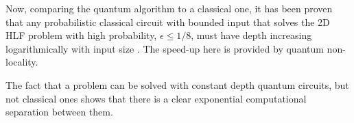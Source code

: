 Now, comparing the quantum algorithm to a classical one, it has been proven that any probabilistic classical circuit with bounded input that solves the 2D HLF problem with high probability, $\epsilon \leq 1/8$, must have depth increasing logarithmically with input size \cite{bib:bravyi2018quantum}. The speed-up here is provided by quantum non-locality. 

The fact that a problem can be solved with constant depth quantum circuits, but not classical ones shows that there is a clear exponential computational separation between them. 